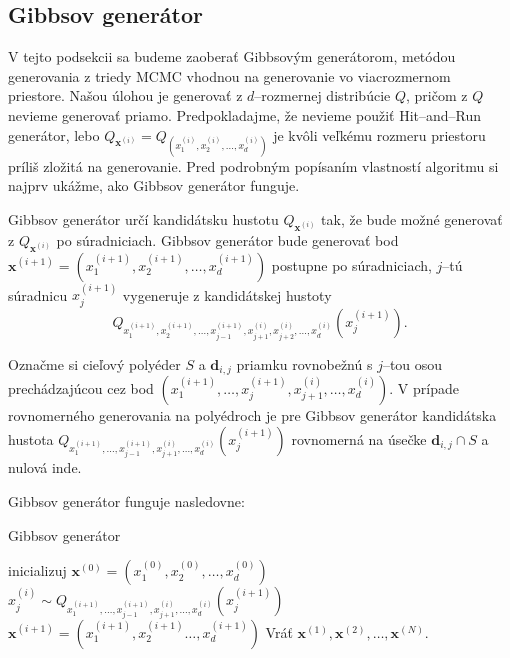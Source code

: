 \subsection{Gibbsov generátor}

V tejto podsekcii sa budeme zaoberať Gibbsovým generátorom, metódou generovania z triedy MCMC vhodnou na generovanie vo viacrozmernom priestore.
Našou úlohou je generovať z $d$--rozmernej distribúcie $Q$, pričom z $Q$ nevieme generovať priamo. Predpokladajme, že nevieme použiť Hit--and--Run generátor, lebo $Q_{\mathbf x^{(i)}}=Q_{(x^{(i)}_1, x^{(i)}_2, \dots, x^{(i)}_d)}$ je kvôli veľkému rozmeru priestoru príliš zložitá na generovanie. Pred podrobným popísaním vlastností algoritmu si najprv ukážme, ako Gibbsov generátor funguje.

Gibbsov generátor určí kandidátsku hustotu $Q_{\mathbf x^{(i)}}$ tak, že bude možné generovať z $Q_{\mathbf x^{(i)}}$ po súradniciach.
Gibbsov generátor bude generovať bod $\mathbf x^{(i+1)}=(x^{(i+1)}_1, x^{(i+1)}_2, \dots, x^{(i+1)}_d)$ postupne po súradniciach, $j$--tú súradnicu $x^{(i+1)}_j$ vygeneruje z kandidátskej hustoty $$Q_{x^{(i+1)}_1, x^{(i+1)}_2, \dots, x^{(i+1)}_{j-1}, x^{(i)}_{j+1}, x^{(i)}_{j+2}, \dots, x^{(i)}_d}(x^{(i+1)}_j).$$

Označme si cieľový polyéder $S$ a $\mathbf d_{i,j}$ priamku rovnobežnú s $j$--tou osou prechádzajúcou cez bod $(x^{(i+1)}_1, \dots, x^{(i+1)}_{j}, x^{(i)}_{j+1}, \dots, x^{(i)}_d)$.
V prípade rovnomerného generovania na polyédroch je pre Gibbsov generátor kandidátska hustota $Q_{x^{(i+1)}_1, \dots, x^{(i+1)}_{j-1}, x^{(i)}_{j+1}, \dots, x^{(i)}_d}(x^{(i+1)}_j)$ rovnomerná na úsečke $\mathbf d_{i,j} \cap S$ a nulová inde.

Gibbsov generátor funguje nasledovne:

\begin{algorithm}[H]
	\caption{Gibbsov generátor \cite{mcmc_intro_mackay}}
	\label{gibbs}
	\begin{algorithmic}[1]
		\State inicializuj $\mathbf x^{(0)} = (x^{(0)}_1, x^{(0)}_2, \dots, x^{(0)}_d)$
				\State $x^{(i)}_j \sim Q_{x^{(i+1)}_1, \dots, x^{(i+1)}_{j-1}, x^{(i)}_{j+1}, \dots, x^{(i)}_d}(x^{(i+1)}_j)$
			\EndFor
			\State $\mathbf x^{(i+1)}= (x^{(i+1)}_1, x^{(i+1)}_2 \dots, x^{(i+1)}_d)$
		\EndFor
		\State Vráť ${\mathbf x^{(1)},\mathbf x^{(2)},\dots,\mathbf x^{(N)}}$.
	\end{algorithmic}
\end{algorithm}

